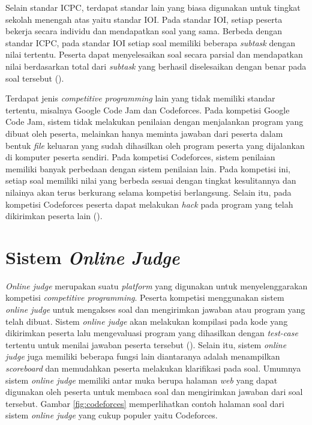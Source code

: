 \par Selain standar ICPC, terdapat standar lain yang biasa digunakan untuk tingkat sekolah menengah atas yaitu standar IOI. Pada standar IOI, setiap peserta bekerja secara individu dan mendapatkan soal yang sama. Berbeda dengan standar ICPC, pada standar IOI setiap soal memiliki beberapa \textit{subtask} dengan nilai tertentu. Peserta dapat menyelesaikan soal secara parsial dan mendapatkan nilai berdasarkan total dari \textit{subtask} yang berhasil diselesaikan dengan benar pada soal tersebut (\cite{ioi2017}).
\par Terdapat jenis \textit{competitive programming} lain yang tidak memiliki standar tertentu, misalnya Google Code Jam dan Codeforces. Pada kompetisi Google Code Jam, sistem tidak melakukan penilaian dengan menjalankan program yang dibuat oleh peserta, melainkan hanya meminta jawaban dari peserta dalam bentuk \textit{file} keluaran yang sudah dihasilkan oleh program peserta yang dijalankan di komputer peserta sendiri. Pada kompetisi Codeforces, sistem penilaian memiliki banyak perbedaan dengan sistem penilaian lain. Pada kompetisi ini, setiap soal memiliki nilai yang berbeda sesuai dengan tingkat kesulitannya dan nilainya akan terus berkurang selama kompetisi berlangsung. Selain itu, pada kompetisi Codeforces peserta dapat melakukan \textit{hack} pada program yang telah dikirimkan peserta lain (\cite{cfrules}).

\section{Sistem \textit{Online Judge}}

\par \textit{Online judge} merupakan suatu \textit{platform} yang digunakan untuk menyelenggarakan kompetisi \textit{competitive programming}. Peserta kompetisi menggunakan sistem \textit{online judge} untuk mengakses soal dan mengirimkan jawaban atau program yang telah dibuat. Sistem \textit{online judge} akan melakukan kompilasi pada kode yang dikirimkan peserta lalu mengevaluasi program yang dihasilkan dengan \textit{test-case} tertentu untuk menilai jawaban peserta tersebut (\cite{wasikojsurvey}). Selain itu, sistem \textit{online judge} juga memiliki beberapa fungsi lain diantaranya adalah menampilkan \textit{scoreboard} dan memudahkan peserta melakukan klarifikasi pada soal. Umumnya sistem \textit{online judge} memiliki antar muka berupa halaman \textit{web} yang dapat digunakan oleh peserta untuk membaca soal dan mengirimkan jawaban dari soal tersebut. Gambar \ref{fig:codeforces} memperlihatkan contoh halaman soal dari sistem \textit{online judge} yang cukup populer yaitu Codeforces.

